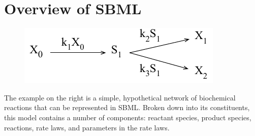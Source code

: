 \documentclass[10pt]{cekarticle}
\newcommand{\changed}[1]{\textcolor{BrickRed}{#1}}
\begin{document}
\section{Overview of SBML}
\label{sec:overview}

\begin{figure}
\begin{center}
\vspace*{-2ex}
\includegraphics[scale = 0.85]{example-network}
\end{center}
\end{figure}
\changed{The example on the right is a simple, hypothetical network of
  biochemical reactions that can be represented in SBML.}  Broken down into
its constituents, this model contains a number of components: reactant
species, product species, reactions, rate laws, and parameters in the rate
laws.
\end{document}
